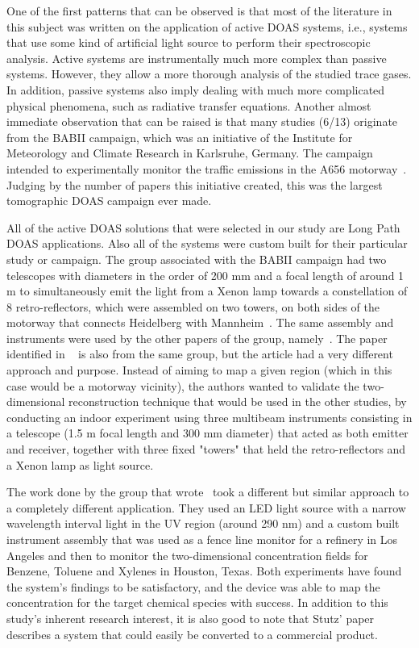 One of the first patterns that can be observed is that most of the
literature in this subject was written on the application of active DOAS
systems, i.e., systems that use some kind of artificial light source to
perform their spectroscopic analysis. Active systems are instrumentally
much more complex than passive systems. However, they allow a more
thorough analysis of the studied trace gases. In addition, passive
systems also imply dealing with much more complicated physical
phenomena, such as radiative transfer equations. Another almost
immediate observation that can be raised is that many studies (6/13)
originate from the BABII campaign, which was an initiative of the
Institute for Meteorology and Climate Research in Karlsruhe, Germany.
The campaign intended to experimentally monitor the traffic emissions in
the A656 motorway~\cite{Laepple2004}. Judging by the number of papers
this initiative created, this was the largest tomographic DOAS campaign
ever made.

All of the active DOAS solutions that were selected in our study are
Long Path DOAS applications. Also all of the systems were custom built for
their particular study or campaign. The group associated with the BABII
campaign had two telescopes with diameters in the order of 200 mm and a
focal length of around 1 m to simultaneously emit the light from a Xenon
lamp towards a constellation of 8 retro-reflectors, which were assembled
on two towers, on both sides of the motorway that connects Heidelberg
with Mannheim~\cite{Pundt2005}. The same assembly and instruments were
used by the other papers of the group, namely~\cite{Hartl2006, Poehler,
Laepple2004}. The paper identified in ~\cite{Mettendorf2006} is also
from the same group, but the article had a very different approach and
purpose. Instead of aiming to map a given region (which in this case
would be a motorway vicinity), the authors wanted to validate the
two-dimensional reconstruction technique that would be used in the other
studies, by conducting an indoor experiment using three multibeam
instruments consisting in a telescope (1.5 m  focal length and 300 mm
diameter) that acted as both emitter and receiver, together with three
fixed "towers" that held the retro-reflectors and a Xenon lamp as light
source.

The work done by the group that wrote~\cite{Stutz2016} took a different
but similar approach to a completely different application. They used an
LED light source with a narrow wavelength interval light in the UV
region (around 290 nm) and a custom built instrument assembly that was
used as a fence line monitor for a refinery in Los Angeles and then to
monitor the two-dimensional concentration fields for Benzene, Toluene
and Xylenes in Houston, Texas. Both experiments have found the system's
findings to be satisfactory, and the device was able to map the
concentration for the target chemical species with success. In addition
to this study's inherent research interest, it is also good to note that
Stutz' paper describes a system that could easily be converted to a
commercial product.


